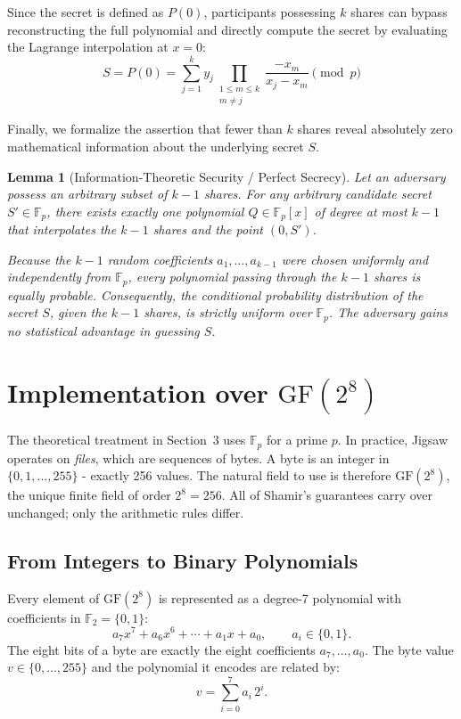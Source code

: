 \documentclass[12pt]{article}
\theoremstyle{definition}
\theoremstyle{plain}
\newtheorem{lemma}[theorem]{Lemma}
\begin{document}
	Since the secret is defined as $P(0)$, participants possessing $k$ shares can bypass reconstructing the full polynomial and directly compute the secret by evaluating the Lagrange interpolation at $x = 0$:
	$$ S = P(0) = \sum_{j=1}^{k} y_j \prod_{\substack{1 \le m \le k \\ m \neq j}} \frac{-x_m}{x_j - x_m} \pmod p $$
	
	Finally, we formalize the assertion that fewer than $k$ shares reveal absolutely zero mathematical information about the underlying secret $S$.
	
	\begin{lemma}[Information-Theoretic Security / Perfect Secrecy]
		Let an adversary possess an arbitrary subset of $k-1$ shares. For any arbitrary candidate secret $S' \in \mathbb{F}_p$, there exists exactly one polynomial $Q \in \mathbb{F}_p[x]$ of degree at most $k-1$ that interpolates the $k-1$ shares \textit{and} the point $(0, S')$. 
		
		Because the $k-1$ random coefficients $a_1, \dots, a_{k-1}$ were chosen uniformly and independently from $\mathbb{F}_p$, every polynomial passing through the $k-1$ shares is equally probable. Consequently, the conditional probability distribution of the secret $S$, given the $k-1$ shares, is strictly uniform over $\mathbb{F}_p$. The adversary gains no statistical advantage in guessing $S$.
	\end{lemma}
	
	
	\section{Implementation over $\mathrm{GF}(2^8)$}
	
	The theoretical treatment in Section~3 uses $\mathbb{F}_p$ for a prime $p$.
	In practice, Jigsaw operates on \emph{files}, which are sequences of bytes.
	A byte is an integer in $\{0, 1, \dots, 255\}$ - exactly 256 values.
	The natural field to use is therefore $\mathrm{GF}(2^8)$, the unique finite
	field of order $2^8 = 256$.  All of Shamir's guarantees carry over
	unchanged; only the arithmetic rules differ.
	
	\subsection{From Integers to Binary Polynomials}
	
	Every element of $\mathrm{GF}(2^8)$ is represented as a degree-7
	polynomial with coefficients in $\mathbb{F}_2 = \{0, 1\}$:
	$$
	a_7 x^7 + a_6 x^6 + \cdots + a_1 x + a_0, \qquad a_i \in \{0,1\}.
	$$
	The eight bits of a byte are exactly the eight coefficients $a_7, \ldots, a_0$.
	The byte value $v \in \{0,\dots,255\}$ and the polynomial it encodes are
	related by:
	$$
	v = \sum_{i=0}^{7} a_i \, 2^i.
	$$
	
\end{document}
